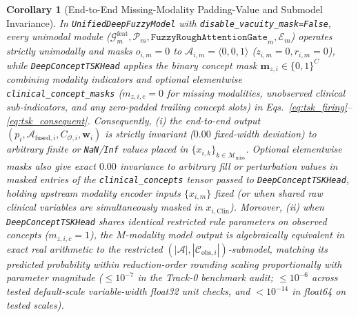 \documentclass[10pt,twocolumn]{article}
\newtheorem{corollary}{Corollary}[theorem]
\begin{document}
\begin{corollary}[End-to-End Missing-Modality Padding-Value and Submodel Invariance]
\label{cor:e2e_vacuity}
In \texttt{UnifiedDeepFuzzyModel} with \texttt{disable\_vacuity\_mask=False}, every unimodal
module ($\mathcal{G}_m^{\text{feat}}, \mathcal{P}_m, \texttt{FuzzyRoughAttentionGate}_m,
\mathcal{E}_m$) operates strictly unimodally and masks $o_{i,m}=0$ to $\mathcal{A}_{i,m} =
\langle 0,0,1\rangle$ ($z_{i,m}=0, r_{i,m}=0$), while \texttt{DeepConceptTSKHead} applies the
binary concept mask $\bm{m}_{z,i} \in \{0,1\}^C$ combining modality indicators and optional
elementwise \texttt{clinical\_\allowbreak concept\_\allowbreak masks} ($m_{z,i,c}=0$ for
missing
modalities, unobserved clinical sub-indicators, and any zero-padded trailing concept slots) in
Eqs.~\eqref{eq:tsk_firing}--\eqref{eq:tsk_consequent}. Consequently, (i) the end-to-end output
$(p_i, \mathcal{A}_{\text{fused},i}, C_{\mathcal{O},i}, \bm{w}_i)$ is strictly invariant
($0.00$
fixed-width deviation) to arbitrary finite or \texttt{NaN}/\texttt{Inf} values placed in
$\{x_{i,k}\}_{k\in\mathcal{M}_{\text{miss}}}$. Optional elementwise masks also give exact
$0.00$ invariance to arbitrary fill or perturbation values in masked entries of the
\texttt{clinical\_\allowbreak concepts} tensor passed to \texttt{DeepConceptTSKHead},
holding upstream modality encoder inputs $\{x_{i,m}\}$ fixed (or when shared raw clinical
variables are simultaneously masked in $x_{i,\text{Clin}}$). Moreover, (ii) when
\texttt{DeepConceptTSKHead} shares identical restricted rule parameters on observed concepts
($m_{z,i,c}=1$), the $M$-modality model output is algebraically equivalent in exact real
arithmetic to the restricted $(|\mathcal{A}|, |\mathcal{C}_{\text{obs},i}|)$-submodel, matching
its predicted probability within reduction-order rounding scaling proportionally with parameter
magnitude ($\le 10^{-7}$ in the Track-0 benchmark audit; $\le 10^{-6}$ across tested
default-scale
variable-width float32 unit checks, and $< 10^{-14}$ in float64 on tested scales).
\end{corollary}
\end{document}
